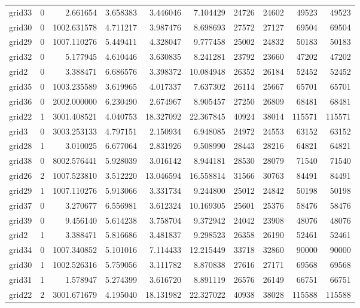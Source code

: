 \begin{longtable}{|l|r|r|r|r|r|r|r|r|r|}
grid33 & 0 & 2.661654 & 3.658383 & 3.446046 & 7.104429 & 24726 & 24602 & 49523 & 49523 \\
grid30 & 0 & 1002.631578 & 4.711217 & 3.987476 & 8.698693 & 27572 & 27127 & 69504 & 69504 \\
grid29 & 0 & 1007.110276 & 5.449411 & 4.328047 & 9.777458 & 25002 & 24832 & 50183 & 50183 \\
grid32 & 0 & 5.177945 & 4.610446 & 3.630835 & 8.241281 & 23792 & 23660 & 47202 & 47202 \\
grid2 & 0 & 3.388471 & 6.686576 & 3.398372 & 10.084948 & 26352 & 26184 & 52452 & 52452 \\
grid35 & 0 & 1003.235589 & 3.619965 & 4.017337 & 7.637302 & 26114 & 25667 & 65701 & 65701 \\
grid36 & 0 & 2002.000000 & 6.230490 & 2.674967 & 8.905457 & 27250 & 26809 & 68481 & 68481 \\
grid22 & 1 & 3001.408521 & 4.040753 & 18.327092 & 22.367845 & 40924 & 38014 & 115571 & 115571 \\
grid3 & 0 & 3003.253133 & 4.797151 & 2.150934 & 6.948085 & 24972 & 24553 & 63152 & 63152 \\
grid28 & 1 & 3.010025 & 6.677064 & 2.831926 & 9.508990 & 28443 & 28216 & 64821 & 64821 \\
grid38 & 0 & 8002.576441 & 5.928039 & 3.016142 & 8.944181 & 28530 & 28079 & 71540 & 71540 \\
grid26 & 2 & 1007.523810 & 3.512220 & 13.046594 & 16.558814 & 31566 & 30763 & 84491 & 84491 \\
grid29 & 1 & 1007.110276 & 5.913066 & 3.331734 & 9.244800 & 25012 & 24842 & 50198 & 50198 \\
grid37 & 0 & 3.270677 & 6.556981 & 3.612324 & 10.169305 & 25601 & 25376 & 58476 & 58476 \\
grid39 & 0 & 9.456140 & 5.614238 & 3.758704 & 9.372942 & 24042 & 23908 & 48076 & 48076 \\
grid2 & 1 & 3.388471 & 5.816686 & 3.481837 & 9.298523 & 26358 & 26190 & 52461 & 52461 \\
grid34 & 0 & 1007.340852 & 5.101016 & 7.114433 & 12.215449 & 33718 & 32860 & 90000 & 90000 \\
grid30 & 1 & 1002.526316 & 5.759056 & 3.111782 & 8.870838 & 27616 & 27171 & 69568 & 69568 \\
grid31 & 1 & 1.578947 & 5.274399 & 3.616720 & 8.891119 & 26576 & 26149 & 66751 & 66751 \\
grid22 & 2 & 3001.671679 & 4.195040 & 18.131982 & 22.327022 & 40938 & 38028 & 115588 & 115588 \\

\end{longtable}
